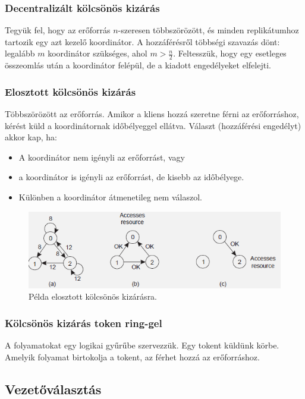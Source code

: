 \documentclass[margin=0px]{article}
\begin{document}
	\subsubsection{Decentralizált kölcsönös kizárás}
	
	Tegyük fel, hogy az erőforrás $n$-szeresen többszörözött, és minden replikátumhoz tartozik egy azt kezelő
	koordinátor. A hozzáférésről többségi szavazás dönt: legalább $m$ koordinátor szükséges, ahol $m>\frac{n}{2}$.
	Feltesszük, hogy egy esetleges összeomlás után a koordinátor felépül, de a kiadott engedélyeket
	elfelejti.
	
	\subsubsection{Elosztott kölcsönös kizárás}
	
	Többszörözött az erőforrás. Amikor a kliens hozzá szeretne férni az erőforráshoz, kérést küld a koordinátornak
	időbélyeggel ellátva. Választ (hozzáférési engedélyt) akkor kap, ha:
	
	\begin{itemize}
		\item	A koordinátor nem igényli az erőforrást, vagy
		\item	a koordinátor is igényli az erőforrást, de kisebb az időbélyege.
		\item	Különben a koordinátor átmenetileg nem válaszol.
	\end{itemize}
	
	\begin{figure}[H]
		\centering
		\includegraphics[width=0.6\linewidth]{img/kolcskizar_elosztott}
		\caption{Példa elosztott kölcsönös kizárásra.}
		\label{fig:kolcskizar_elosztott}
	\end{figure}
	
	\subsubsection{Kölcsönös kizárás token ring-gel}
	
	A folyamatokat egy logikai gyűrűbe szervezzük. Egy tokent küldünk körbe. Amelyik folyamat birtokolja a tokent, az
	férhet hozzá az erőforráshoz.
	
	\subsection{Vezetőválasztás}
	
\end{document}
